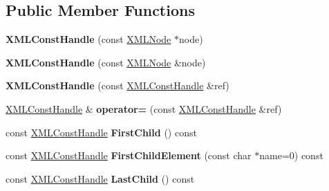 \subsection*{Public Member Functions}
\begin{DoxyCompactItemize}
\item 
{\bfseries X\+M\+L\+Const\+Handle} (const \hyperlink{classtinyxml2_1_1XMLNode}{X\+M\+L\+Node} $\ast$node)\hypertarget{classtinyxml2_1_1XMLConstHandle_a098bda71fa11d7c74ccddab59d5dd534}{}\label{classtinyxml2_1_1XMLConstHandle_a098bda71fa11d7c74ccddab59d5dd534}

\item 
{\bfseries X\+M\+L\+Const\+Handle} (const \hyperlink{classtinyxml2_1_1XMLNode}{X\+M\+L\+Node} \&node)\hypertarget{classtinyxml2_1_1XMLConstHandle_a8420a0c4720637e0529e78c2e22f2b0b}{}\label{classtinyxml2_1_1XMLConstHandle_a8420a0c4720637e0529e78c2e22f2b0b}

\item 
{\bfseries X\+M\+L\+Const\+Handle} (const \hyperlink{classtinyxml2_1_1XMLConstHandle}{X\+M\+L\+Const\+Handle} \&ref)\hypertarget{classtinyxml2_1_1XMLConstHandle_a639317ad315ff24f4ef0dc69312d7303}{}\label{classtinyxml2_1_1XMLConstHandle_a639317ad315ff24f4ef0dc69312d7303}

\item 
\hyperlink{classtinyxml2_1_1XMLConstHandle}{X\+M\+L\+Const\+Handle} \& {\bfseries operator=} (const \hyperlink{classtinyxml2_1_1XMLConstHandle}{X\+M\+L\+Const\+Handle} \&ref)\hypertarget{classtinyxml2_1_1XMLConstHandle_a2d74c91df1ff9aa5f9b57e3dceddbf94}{}\label{classtinyxml2_1_1XMLConstHandle_a2d74c91df1ff9aa5f9b57e3dceddbf94}

\item 
const \hyperlink{classtinyxml2_1_1XMLConstHandle}{X\+M\+L\+Const\+Handle} {\bfseries First\+Child} () const \hypertarget{classtinyxml2_1_1XMLConstHandle_a64c4ff7074effc1fd181d68d23f9d1e4}{}\label{classtinyxml2_1_1XMLConstHandle_a64c4ff7074effc1fd181d68d23f9d1e4}

\item 
const \hyperlink{classtinyxml2_1_1XMLConstHandle}{X\+M\+L\+Const\+Handle} {\bfseries First\+Child\+Element} (const char $\ast$name=0) const \hypertarget{classtinyxml2_1_1XMLConstHandle_a686a96a178dfb51ca9402e22b4a4cd10}{}\label{classtinyxml2_1_1XMLConstHandle_a686a96a178dfb51ca9402e22b4a4cd10}

\item 
const \hyperlink{classtinyxml2_1_1XMLConstHandle}{X\+M\+L\+Const\+Handle} {\bfseries Last\+Child} () const \hypertarget{classtinyxml2_1_1XMLConstHandle_afec9a68e7951193bc5a6e876d602f263}{}\label{classtinyxml2_1_1XMLConstHandle_afec9a68e7951193bc5a6e876d602f263}


\end{DoxyCompactItemize}
